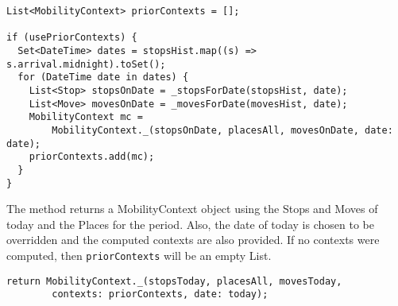 \begin{verbatim}
List<MobilityContext> priorContexts = [];

if (usePriorContexts) {
  Set<DateTime> dates = stopsHist.map((s) => s.arrival.midnight).toSet();
  for (DateTime date in dates) {
    List<Stop> stopsOnDate = _stopsForDate(stopsHist, date);
    List<Move> movesOnDate = _movesForDate(movesHist, date);
    MobilityContext mc =
        MobilityContext._(stopsOnDate, placesAll, movesOnDate, date: date);
    priorContexts.add(mc);
  }
}
\end{verbatim}

The method returns a MobilityContext object using the Stops and Moves of today and the Places for the period. Also, the date of today is chosen to be overridden and the computed contexts are also provided. If no contexts were computed, then \verb|priorContexts| will be an empty List.

\begin{verbatim}
return MobilityContext._(stopsToday, placesAll, movesToday,
        contexts: priorContexts, date: today);
\end{verbatim}


